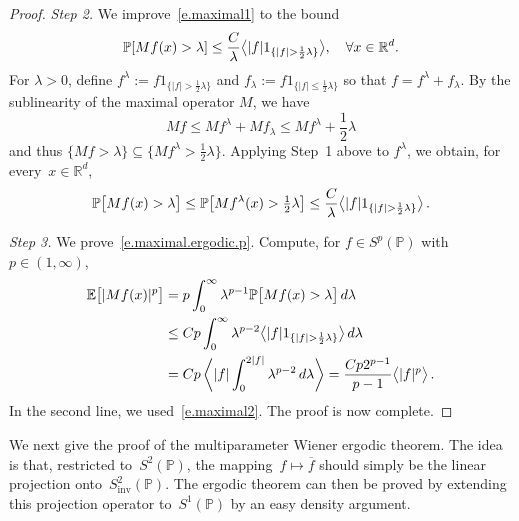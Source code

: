 \documentclass[11pt]{article} %
\numberwithin{equation}{section}
\theoremstyle{definition}
\let\originalleft\left
\let\originalright\right
\renewcommand{\left}{\mathopen{}\mathclose\bgroup\originalleft}
\renewcommand{\right}{\aftergroup\egroup\originalright}
\newcommand*{\Rd}{\ensuremath{\mathbb{R}^d}}
\newcommand{\inv}{\mathrm{inv}}
\renewcommand{\P}{\mathbb{P}}
\newcommand{\E}{\mathbb{E}}
\newcommand{\indc}{1}
\begin{document}
\begin{proof}
\smallskip

\emph{Step 2.} We improve~\eqref{e.maximal1} to the bound
\begin{equation}
\label{e.maximal2}
\P \left[ Mf(x) > \lambda \right] 
\leq 
\frac{C}{\lambda} \bigl\langle \left| f \right| \indc_{\{ |f| > \frac12\lambda \} } \bigr\rangle, \quad \forall x\in \Rd.
\end{equation}
For $\lambda>0$, define $f^\lambda:= f \indc_{\{ |f| > \frac12\lambda\}}$ and $f_\lambda := f \indc_{\{ |f| \leq \frac12\lambda\}}$ so that $f= f^\lambda+f_\lambda$. 
By the sublinearity of the maximal operator $M$, we have 
\begin{equation*}
Mf 
\leq M f^\lambda + Mf_\lambda
\leq Mf^\lambda + \frac12\lambda
\end{equation*}
and thus $\{ Mf > \lambda \} \subseteq \{ M f^\lambda > \frac12\lambda\}$. Applying Step~1 above to $f^{\lambda}$, we obtain, for every~$x\in\Rd$, 
\begin{equation*}
\P \bigl[ Mf(x) > \lambda \bigr]
\leq 
\P \bigl[ Mf^{\lambda} (x) > \tfrac12\lambda \bigr]
\leq
\frac{C}{\lambda} \bigl\langle \left| f \right| \indc_{\{ |f| > \frac12\lambda \} } \bigr\rangle\,.
\end{equation*}

\emph{Step 3.} We prove~\eqref{e.maximal.ergodic.p}.
Compute, for $f\in S^p(\P)$ with $p\in (1,\infty)$, 
\begin{align*}
\E \bigl[ |Mf(x)|^p \bigr]
&
=
p\int_0^\infty\lambda^{p-1} \P \bigl[ Mf(x) >\lambda \bigr] \,d\lambda
\\ & 
\leq
Cp
\int_0^\infty \lambda^{p-2}
\bigl\langle \left| f \right| \indc_{\{ |f| > \frac12\lambda \} } \bigr\rangle \, d\lambda
\\ & 
= 
Cp \,
\biggl\langle
|f| 
\int_0^{2|f|} \lambda^{p-2} \,d\lambda
\biggr\rangle
=
\frac{Cp 2^{p-1}}{p-1}
\bigl\langle |f|^p \bigr\rangle\,.
\end{align*}
In the second line, we used~\eqref{e.maximal2}. 
The proof is now complete. 
\end{proof}

We next give the proof of the multiparameter Wiener ergodic theorem. The idea is that, restricted to~$S^2(\P)$, the mapping~$f\mapsto \overline{f}$ should simply be the linear projection onto~$S^2_\inv(\P)$. The ergodic theorem can then be proved by extending this projection operator to~$S^1(\P)$ by an easy density argument. 
\end{document}
